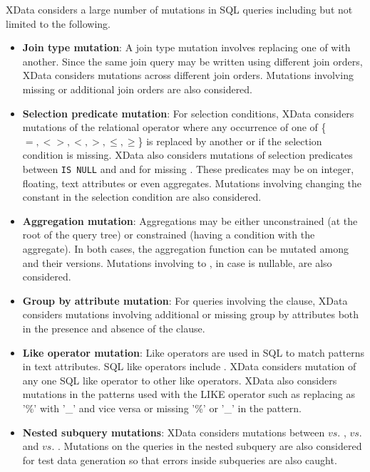 XData considers a large number of mutations in SQL queries including but not limited to the following.
\begin{itemize}
    \item \textbf{Join type mutation}: A join type mutation involves replacing one of  with another.  Since the same join query may be written using different join orders, XData considers mutations across different join orders. Mutations involving missing or additional join orders are also considered. 

    \item \textbf{Selection predicate mutation}: For selection conditions, XData considers mutations of the relational
operator where any occurrence of one of  \{$=, <>, <, >, \leq, \geq$\} is replaced by another or if the selection condition is missing. XData also considers mutations of selection predicates between \texttt{IS NULL} and  and for missing . These predicates may be on integer, floating, text attributes or even aggregates. Mutations involving changing the constant in the selection condition are also considered. 
    \item \textbf{Aggregation mutation}: Aggregations may be either unconstrained (at the root of the query tree) or constrained (having a condition with the aggregate). In both cases, the aggregation function can be mutated among  and their  versions. 
    Mutations involving  to , in case  is nullable, are also considered. 
    \item \textbf{Group by attribute mutation}: For queries involving the  clause, XData considers mutations involving additional or missing group by attributes both in the presence and absence of the  clause. 
    \item \textbf{Like operator mutation}: Like operators are used in SQL to match patterns in text attributes. SQL like operators include . XData considers mutation of any one SQL like operator to other like operators. XData also considers mutations in the patterns used with the LIKE operator such as replacing as '\%' with '\_' and vice versa or missing '\%' or '\_' in the pattern.
    \item \textbf{Nested subquery mutations}: XData considers mutations between  $vs.$ ,  $vs.$  and  $vs.$ . Mutations on the queries in the nested subquery are also considered for test data generation so that errors inside subqueries are also caught. 

\end{itemize}
